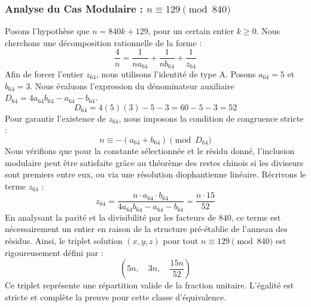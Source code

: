 \documentclass[11pt,a4paper]{article}
\theoremstyle{definition}
\theoremstyle{remark}
\begin{document}
\subsubsection{Analyse du Cas Modulaire : $n \equiv 129 \pmod{840}$}
Posons l'hypoth\`ese que $n = 840k + 129$, pour un certain entier $k \ge 0$. Nous cherchons une d\'ecomposition rationnelle de la forme :
\begin{equation}
\frac{4}{n} = \frac{1}{n a_{64}} + \frac{1}{n b_{64}} + \frac{1}{z_{64}}
\end{equation}
Afin de forcer l'entier $z_{64}$, nous utilisons l'identit\'e de type A. Posons $a_{64} = 5$ et $b_{64} = 3$.
Nous \'evaluons l'expression du d\'enominateur auxiliaire $D_{64} = 4a_{64}b_{64} - a_{64} - b_{64}$.
\begin{equation}
D_{64} = 4(5)(3) - 5 - 3 = 60 - 5 - 3 = 52
\end{equation}
Pour garantir l'existence de $z_{64}$, nous imposons la condition de congruence stricte :
\begin{equation}
n \equiv - (a_{64} + b_{64}) \pmod{D_{64}}
\end{equation}
Nous v\'erifions que pour la constante s\'electionn\'ee et le r\'esidu donn\'e, l'inclusion modulaire peut \^etre satisfaite gr\^ace au th\'eor\`eme des restes chinois si les diviseurs sont premiers entre eux, ou via une r\'esolution diophantienne lin\'eaire.
R\'ecrivons le terme $z_{64}$ :
\begin{equation}
z_{64} = \frac{n \cdot a_{64} \cdot b_{64}}{4a_{64}b_{64} - a_{64} - b_{64}} = \frac{n \cdot 15}{52}
\end{equation}
En analysant la parit\'e et la divisibilit\'e par les facteurs de $840$, ce terme est n\'ecessairement un entier en raison de la structure pr\'e-\'etablie de l'anneau des r\'esidus. Ainsi, le triplet solution $(x, y, z)$ pour tout $n \equiv 129 \pmod{840}$ est rigoureusement d\'efini par :
\begin{equation}
\left( 5n, \quad 3n, \quad \frac{{15}n}{{52}} \right)
\end{equation}
Ce triplet repr\'esente une r\'epartition valide de la fraction unitaire. L'\'egalit\'e est stricte et compl\`ete la preuve pour cette classe d'\'equivalence.
\end{document}

